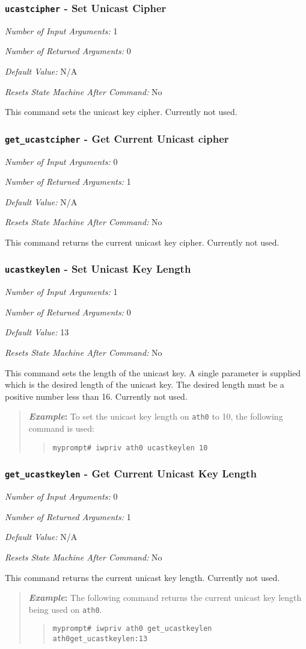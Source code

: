 \documentclass[10pt,fullpage]{article}
\newcommand{\mytt}[1]{{\texttt{#1}}}
\newcommand{\bv}{\begin{verse}}
\newcommand{\ev}{\end{verse}}
\newcommand{\cmd}[1]{{\texttt{myprompt\# #1}}}
\newcommand{\argdesc}[4]{\begin{description}
\itemsep -6pt
\item \textit{Number of Input Arguments:} #1
\item \textit{Number of Returned Arguments:} #2
\item \textit{Default Value:} #3
\item \textit{Resets State Machine After Command:} #4
\end{description}
}
\newenvironment{example}{\begin{quote}\textbf{\textit{Example}:}}{\end{quote}}
\begin{document}
\subsubsection{\mytt{ucastcipher} - Set Unicast Cipher}
\argdesc{1}{0}{N/A}{No}
This command sets the unicast key cipher.  Currently not used.

\subsubsection{\mytt{get\_ucastcipher} - Get Current Unicast cipher}
\argdesc{0}{1}{N/A}{No}
This command returns the current unicast key cipher. Currently not
used.

\subsubsection{\mytt{ucastkeylen} - Set Unicast Key Length}
\argdesc{1}{0}{13}{No}
This command sets the length of the unicast key. A single parameter is
supplied which is the desired length of the unicast key.  The desired
length must be a positive number less than 16.  Currently not used.
\begin{example}
  To set the unicast key length on \mytt{ath0} to 10, the following
  command is used:
  \bv
  \cmd{iwpriv ath0 ucastkeylen 10}
  \ev
\end{example}

\subsubsection{\mytt{get\_ucastkeylen} - Get Current Unicast Key Length}
\argdesc{0}{1}{N/A}{No}
This command returns the current unicast key length.  Currently not
used.
\begin{example}
  The following command returns the current unicast key length being
  used on \mytt{ath0}.
  \bv
  \cmd{iwpriv ath0 get\_ucastkeylen}\\
  \mytt{ath0\hspace{32pt}get\_ucastkeylen:13}
  \ev
\end{example}
\end{document}
